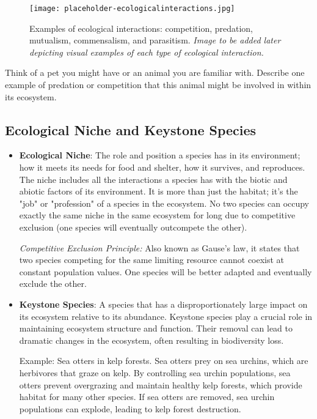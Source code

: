 \begin{figure}[h]
    \texttt{[image: placeholder-ecologicalinteractions.jpg]}
    \caption{Examples of ecological interactions: competition, predation, mutualism, commensalism, and parasitism. \textit{Image to be added later depicting visual examples of each type of ecological interaction.}}
\end{figure}

\begin{stopandthink}
Think of a pet you might have or an animal you are familiar with.  Describe one example of predation or competition that this animal might be involved in within its ecosystem.
\end{stopandthink}

\subsection{Ecological Niche and Keystone Species}

\begin{itemize}
    \item \textbf{Ecological Niche}:  The role and position a species has in its environment; how it meets its needs for food and shelter, how it survives, and reproduces. The niche includes all the interactions a species has with the biotic and abiotic factors of its environment.  It is more than just the habitat; it's the "job" or "profession" of a species in the ecosystem.  No two species can occupy exactly the same niche in the same ecosystem for long due to competitive exclusion (one species will eventually outcompete the other).

    \begin{marginnote}
    \textit{Competitive Exclusion Principle:}  Also known as Gause's law, it states that two species competing for the same limiting resource cannot coexist at constant population values. One species will be better adapted and eventually exclude the other. 
    \end{marginnote}

    \item \textbf{Keystone Species}:  A species that has a disproportionately large impact on its ecosystem relative to its abundance. Keystone species play a crucial role in maintaining ecosystem structure and function. Their removal can lead to dramatic changes in the ecosystem, often resulting in biodiversity loss.
    \begin{example} Example: Sea otters in kelp forests. Sea otters prey on sea urchins, which are herbivores that graze on kelp. By controlling sea urchin populations, sea otters prevent overgrazing and maintain healthy kelp forests, which provide habitat for many other species.  If sea otters are removed, sea urchin populations can explode, leading to kelp forest destruction.\end{example}
\end{itemize}

